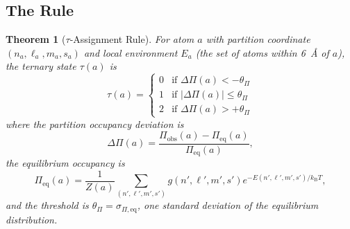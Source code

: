 \documentclass[11pt,twocolumn,a4paper]{article}
\newtheorem{theorem}{Theorem}[section]
\theoremstyle{definition}
\theoremstyle{remark}
\newcommand{\kB}{k_{\mathrm{B}}}
\begin{document}
\subsection{The Rule}

\begin{theorem}[$\tau$-Assignment Rule]
\label{thm:tau_rule}
For atom $a$ with partition coordinate $(n_a, \ell_a, m_a, s_a)$ and local environment $E_a$ (the set of atoms within 6~\AA{} of $a$), the ternary state $\tau(a)$ is
\begin{equation}
\tau(a) = \begin{cases}
0 & \text{if } \Delta\Pi(a) < -\theta_\Pi \\
1 & \text{if } |\Delta\Pi(a)| \leq \theta_\Pi \\
2 & \text{if } \Delta\Pi(a) > +\theta_\Pi
\end{cases}
\label{eq:tau_rule}
\end{equation}
where the partition occupancy deviation is
\begin{equation}
\Delta\Pi(a) = \frac{\Pi_{\mathrm{obs}}(a) - \Pi_{\mathrm{eq}}(a)}{\Pi_{\mathrm{eq}}(a)},
\end{equation}
the equilibrium occupancy is
\begin{equation}
\Pi_{\mathrm{eq}}(a) = \frac{1}{Z(a)} \sum_{(n', \ell', m', s')} g(n', \ell', m', s') e^{-E(n', \ell', m', s')/\kB T},
\end{equation}
and the threshold is $\theta_\Pi = \sigma_{\Pi,\mathrm{eq}}$, one standard deviation of the equilibrium distribution.
\end{theorem}
\end{document}
